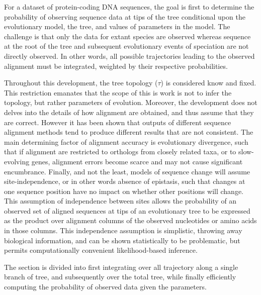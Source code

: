 For a dataset of protein-coding \acrshort{DNA} sequences, the goal is first to determine the probability of observing sequence data at tips of the tree conditional upon the evolutionary model, the tree, and values of parameters in the model.
The challenge is that only the data for extant species are observed whereas sequence at the root of the tree and subsequent evolutionary events of speciation are not directly observed.
In other words, all possible trajectories leading to the observed alignment must be integrated, weighted by their respective probabilities.

Throughout this development, the tree topology ($\tau$) is considered know and fixed.
This restriction emanates that the scope of this is work is not to infer the topology, but rather parameters of evolution.
Moreover, the development does not delves into the details of how alignment are obtained, and thus assume that they are correct.
However it has been shown that outputs of different sequence alignment methods tend to produce different results that are not consistent.
The main determining factor of alignment accuracy is evolutionary divergence, such that if alignment are restricted to orthologs from closely related taxa, or to slow-evolving genes, alignment errors become scarce and may not cause significant encumbrance.
Finally, and not the least, models of sequence change will assume site-independence, or in other words absence of epistasis, such that changes at one sequence position have no impact on whether other positions will change.
This assumption of independence between sites allows the probability of an observed set of aligned sequences at tips of an evolutionary tree to be expressed as the product over alignment columns of the observed nucleotides or amino acids in those columns.
This independence assumption is simplistic, throwing away biological information, and can be shown statistically to be problematic, but permits computationally convenient likelihood-based inference.

The section is divided into first integrating over all trajectory along a single branch of tree, and subsequently over the total tree, while finally efficiently computing the probability of observed data given the parameters.


